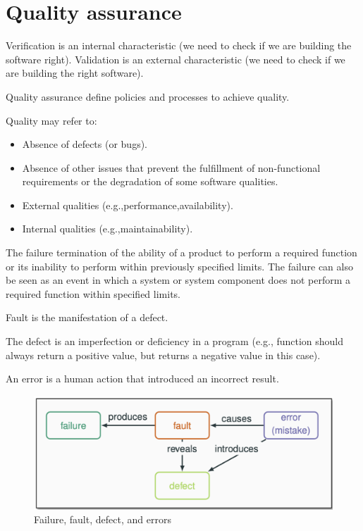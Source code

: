 \section{Quality assurance}

Verification is an internal characteristic (we need to check if we are building the software right).
Validation is an external characteristic (we need to check if we are building the right software).

\begin{definition}
    Quality assurance define policies and processes to achieve quality. 
\end{definition}
Quality may refer to: 
\begin{itemize}
    \item Absence of defects (or bugs).
    \item Absence of other issues that prevent the fulfillment of non-functional requirements or the degradation of some software qualities. 
    \item External qualities (e.g.,performance,availability). 
    \item Internal qualities (e.g.,maintainability). 
\end{itemize}

\begin{definition}
    The failure termination of the ability of a product to perform a required function or its inability to perform within previously specified limits.
    The failure can also be seen as an event in which a system or system component does not perform a required function within specified limits.
\end{definition}
\begin{definition}
    Fault is the manifestation of a defect. 
\end{definition}
\begin{definition}
    The defect is an imperfection or deficiency in a program (e.g., function should always return a positive value, but returns a negative value in this case). 
\end{definition}
\begin{definition}
    An error is a human action that introduced an incorrect result. 
\end{definition}
\begin{figure}[H]
    \centering
    \includegraphics[width=0.6\linewidth]{images/ver.png}
    \caption{Failure, fault, defect, and errors}
\end{figure}

